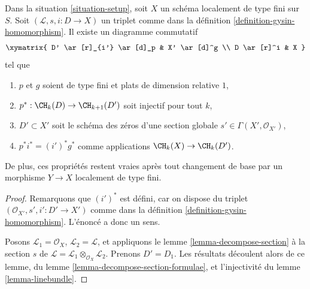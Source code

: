 \begin{lemma}
\label{lemma-normal-cone-effective-Cartier}
Dans la situation \ref{situation-setup}, soit $X$ un schéma localement
de type fini sur $S$. Soit $(\mathcal{L}, s, i : D \to X)$
un triplet comme dans la définition \ref{definition-gysin-homomorphism}.
Il existe un diagramme commutatif
$$
\xymatrix{
D' \ar[r]_{i'} \ar[d]_p & X' \ar[d]^g \\
D \ar[r]^i & X
}
$$
tel que
\begin{enumerate}
\item $p$ et $g$ soient de type fini et plats de dimension relative $1$,
\item $p^* : \CH_k(D) \to \CH_{k + 1}(D')$ soit injectif pour tout $k$,
\item $D' \subset X'$ soit le schéma des zéros d'une section globale
$s' \in \Gamma(X', \mathcal{O}_{X'})$,
\item $p^*i^* = (i')^*g^*$ comme applications $\CH_k(X) \to \CH_k(D')$.
\end{enumerate}
De plus, ces propriétés restent vraies après tout changement de base
par un morphisme $Y \to X$ localement de type fini.
\end{lemma}

\begin{proof}
Remarquons que $(i')^*$ est défini, car on dispose du triplet
$(\mathcal{O}_{X'}, s', i' : D' \to X')$ comme dans la
définition \ref{definition-gysin-homomorphism}. L'énoncé a donc un sens.

\medskip\noindent
Posons $\mathcal{L}_1 = \mathcal{O}_X$, $\mathcal{L}_2 = \mathcal{L}$,
et appliquons le lemme \ref{lemma-decompose-section} à la section $s$ de
$\mathcal{L} = \mathcal{L}_1 \otimes_{\mathcal{O}_X} \mathcal{L}_2$.
Prenons $D' = D_1$. Les résultats découlent alors de ce lemme, du
lemme \ref{lemma-decompose-section-formulae},
et l'injectivité du
lemme \ref{lemma-linebundle}.
\end{proof}

